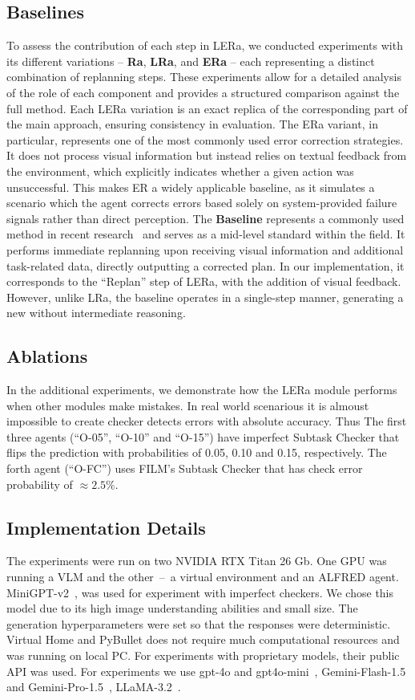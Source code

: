 \documentclass[letterpaper, 10 pt, conference]{ieeeconf}  %
\begin{document}
\subsection{Baselines}
To assess the contribution of each step in LERa, we conducted experiments with its different variations -- \textbf{Ra}, \textbf{LRa}, and \textbf{ERa} -- each representing a distinct combination of replanning steps. These experiments allow for a detailed analysis of the role of each component and provides a structured comparison against the full method. Each LERa variation is an exact replica of the corresponding part of the main approach, ensuring consistency in evaluation. The ERa variant, in particular, represents one of the most commonly used error correction strategies. It does not process visual information but instead relies on textual feedback from the environment, which explicitly indicates whether a given action was unsuccessful. This makes ER a widely applicable baseline, as it simulates a scenario which the agent corrects errors based solely on system-provided failure signals rather than direct perception. The \textbf{Baseline} represents a commonly used method in recent research~\cite{zhang2023grounding,mei2024replanvlm} and serves as a mid-level standard within the field. It performs immediate replanning upon receiving visual information and additional task-related data, directly outputting a corrected plan. In our implementation, it corresponds to the ``Replan'' step of LERa, with the addition of visual feedback. However, unlike LRa, the baseline operates in a single-step manner, generating a new without intermediate reasoning.

\subsection{Ablations}
In the additional experiments, we demonstrate how the LERa module performs when other modules make mistakes. In real world scenarious it is almoust impossible to create checker detects errors with absolute accuracy. Thus The first three agents (``O-05'', ``O-10'' and ``O-15'') have imperfect Subtask Checker that flips the prediction with probabilities of 0.05, 0.10 and 0.15, respectively. The forth agent (``O-FC'') uses FILM's \cite{min2021film} Subtask Checker that has check error probability of $\approx 2.5\%$. 


\subsection{Implementation Details}
The experiments were run on two NVIDIA RTX Titan 26 Gb. One GPU was running a VLM and the other~--~a virtual environment and an ALFRED agent.  MiniGPT-v2~\cite{chen2023minigptv2}, was used for experiment with imperfect checkers. We chose this model due to its high image understanding abilities and small size. The generation hyperparameters were set so that the responses were deterministic. Virtual Home and PyBullet does not require much computational resources and was running on local PC. For experiments with proprietary models, their public API was used.
For experiments we use gpt-4o and gpt4o-mini~\cite{hurst2024gpt}, Gemini-Flash-1.5 and Gemini-Pro-1.5~\cite{team2023gemini}, LLaMA-3.2~\cite{dubey2024llama}.
\end{document}
